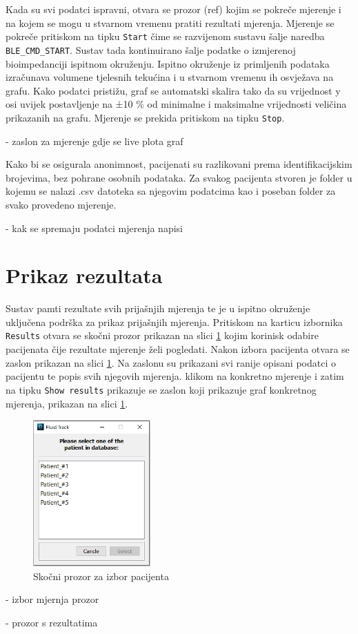 \documentclass[../diplomski_rad.tex]{subfiles}
\begin{document}
Kada su svi podatci ispravni, otvara se prozor (ref) kojim se pokreče mjerenje i na kojem 
se mogu u stvarnom vremenu pratiti rezultati mjerenja. 
Mjerenje se pokreče pritiskom na tipku \texttt{Start} čime se razvijenom sustavu šalje naredba \texttt{BLE\_CMD\_START}. 
Sustav tada kontinuirano šalje podatke o izmjerenoj bioimpedanciji ispitnom okruženju. 
Ispitno okruženje iz primljenih podataka izračunava volumene tjelesnih tekućina i u stvarnom vremenu ih osvježava na grafu. 
Kako podatci pristižu, graf se automatski skalira tako da su vrijednost y osi uvijek postavljenje na ±10 \% 
od minimalne i maksimalne vrijednosti veličina prikazanih na grafu.   
Mjerenje se prekida pritiskom na tipku \texttt{Stop}.

- zaslon za mjerenje gdje se live plota graf

Kako bi se osigurala anonimnost, pacijenati su razlikovani prema identifikacijskim brojevima, bez pohrane osobnih podataka. 
Za svakog pacijenta stvoren je folder u kojemu se nalazi .csv datoteka sa njegovim podatcima kao i poseban folder za 
svako provedeno mjerenje.

- kak se spremaju podatci mjerenja napisi

\section{Prikaz rezultata}

Sustav pamti rezultate svih prijašnjih mjerenja te je u ispitno okruženje uključena podrška za prikaz prijašnjih mjerenja. 
Pritiskom na karticu izbornika \texttt{Results} otvara se skočni prozor prikazan na slici \ref{slk:select_patient} kojim korinisk odabire pacijenata 
čije rezultate mjerenje želi pogledati. Nakon izbora pacijenta otvara se zaslon prikazan na slici \ref{}. 
Na zaslonu su prikazani svi ranije opisani podatci o pacijentu te popis svih njegovih mjerenja. 
klikom na konkretno mjerenje i zatim na tipku \texttt{Show results} prikazuje se zaslon koji prikazuje 
graf konkretnog mjerenja, prikazan na slici \ref{}. 

\begin{figure}[htb]
    \centering
    \includegraphics[width=0.4\textwidth]{Figures/select_patient.png} 
    \caption{Skočni prozor za izbor pacijenta}
    \label{slk:select_patient}
\end{figure}

- izbor mjernja prozor

- prozor s rezultatima
\end{document}
